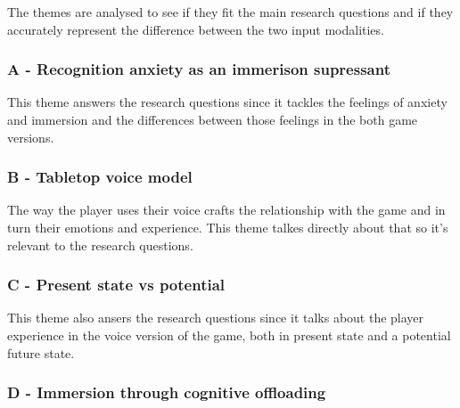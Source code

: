 The themes are analysed to see if they fit the main research questions and if they accurately represent the difference between the two input modalities.


\subsubsection{A - Recognition anxiety as an immerison supressant}


This theme answers the research questions since it tackles the feelings of anxiety and immersion and the differences between those feelings in the both game versions.


\subsubsection{B - Tabletop voice model}

The way the player uses their voice crafts the relationship with the game and in turn their emotions and experience. This theme talkes directly about that so it's relevant to the research questions.

\subsubsection{C - Present state vs potential}


This theme also ansers the research questions since it talks about the player experience in the voice version of the game, both in present state and a potential future state.

\subsubsection{D - Immersion through cognitive offloading}



